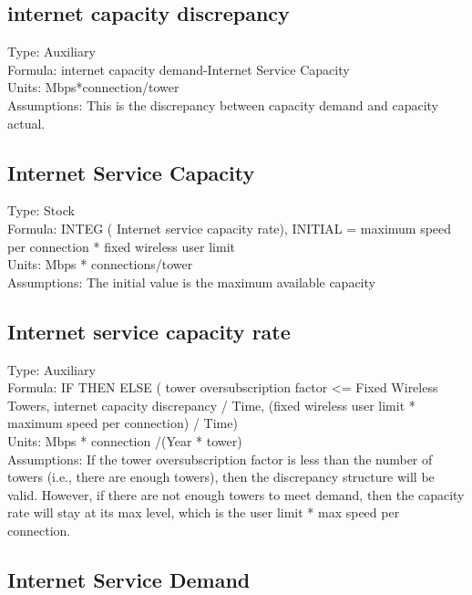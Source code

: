 \documentclass[
  11pt,
]{book}
\begin{document}
\hypertarget{internet-capacity-discrepancy}{%
\subsection{internet capacity discrepancy}\label{internet-capacity-discrepancy}}

Type: Auxiliary\\
Formula: internet capacity demand-Internet Service Capacity\\
Units: Mbps*connection/tower\\
Assumptions: This is the discrepancy between capacity demand and capacity actual.

\hypertarget{internet-service-capacity}{%
\subsection{Internet Service Capacity}\label{internet-service-capacity}}

Type: Stock\\
Formula: INTEG ( Internet service capacity rate), INITIAL = maximum speed per connection * fixed wireless user limit\\
Units: Mbps * connections/tower\\
Assumptions: The initial value is the maximum available capacity

\hypertarget{internet-service-capacity-rate}{%
\subsection{Internet service capacity rate}\label{internet-service-capacity-rate}}

Type: Auxiliary\\
Formula: IF THEN ELSE ( tower oversubscription factor \textless= Fixed Wireless Towers, internet capacity discrepancy / Time, (fixed wireless user limit * maximum speed per connection) / Time)\\
Units: Mbps * connection /(Year * tower)\\
Assumptions: If the tower oversubscription factor is less than the number of towers (i.e., there are enough towers), then the discrepancy structure will be valid. However, if there are not enough towers to meet demand, then the capacity rate will stay at its max level, which is the user limit * max speed per connection.

\hypertarget{internet-service-demand}{%
\subsection{Internet Service Demand}\label{internet-service-demand}}
\end{document}
